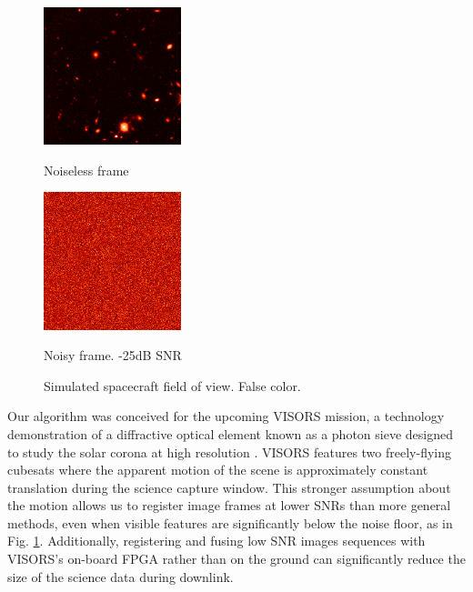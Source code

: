 \documentclass{article}
\begin{document}
\begin{figure}[htb]
\begin{minipage}[b]{.48\linewidth}
  \centering
  \centerline{\includegraphics[width=4.0cm]{images/frame_clean.png}}
  \centerline{Noiseless frame}\medskip
\end{minipage}
\hfill
\begin{minipage}[b]{0.48\linewidth}
  \centering
  \centerline{\includegraphics[width=4.0cm]{images/frame.png}}
  \centerline{Noisy frame. -25dB SNR}\medskip
\end{minipage}
  \caption{Simulated spacecraft field of view.  False color.}
\label{fig:scene}
\end{figure}

Our algorithm was conceived for the upcoming VISORS mission, a technology demonstration of a diffractive optical element known as a photon sieve designed to study the solar corona at high resolution \cite{gundamraj2021preliminary} \cite{lightseyconcept2022}. VISORS features two freely-flying cubesats where the apparent motion of the scene is approximately constant translation during the science capture window.  This stronger assumption about the motion allows us to register image frames at lower SNRs than more general methods, even when visible features are significantly below the noise floor, as in Fig. \ref{fig:scene}.  Additionally, registering and fusing low SNR images sequences with VISORS's on-board FPGA rather than on the ground can significantly reduce the size of the science data during downlink.

\end{document}
